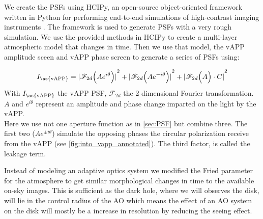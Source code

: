 \label{sec:hcipy}
We create the \acp{PSF} using \ac{HCIPy}, an open-source object-oriented framework written in Python for performing end-to-end simulations of high-contrast imaging instruments \cite{hcipy}. The framework is used to generate \acp{PSF} with a very rough simulation. We use the provided methods in \ac{HCIPy} to create a multi-layer atmospheric model that changes in time. Then we use that model, the \ac{vAPP} amplitude sceen and \ac{vAPP} phase screen to generate a series of \acp{PSF} using:

\begin{equation}
I_\text{\ac{vAPP}} = {\mathopen| \mathscr{F}_{2d}\Big( Ae^{i\theta}\Big) \mathclose|}^2 + {\mathopen| \mathscr{F}_{2d}\Big( Ae^{-i\theta}\Big) \mathclose|}^2 + {\mathopen| \mathscr{F}_{2d}\Big( A \Big) \cdot C \mathclose|}^2
\end{equation}
With $I_\text{\ac{vAPP}}$ the \ac{vAPP} \ac{PSF}, $\mathscr{F}_{2d}$ the 2 dimensional Fourier transformation. $A$ and $e^{i\theta}$ represent an amplitude and phase change imparted on the light by the \ac{vAPP}.\\

Here we use not one aperture function as in \autoref{sec:PSF} but combine three. The first two ($Ae^{\pm i\theta}$) simulate the opposing phases the circular polarization receive from the \ac{vAPP} (see \autoref{fig:into_vapp_annotated}). The third factor, is called the leakage term.

Instead of modeling an adaptive optics system we modified the Fried parameter for the atmosphere to get similar morphological changes in time to the available on-sky images. This is sufficient as the dark hole, where we will observes the disk, will lie in the control radius of the \ac{AO} which means the effect of an \ac{AO} system on the disk will mostly be a increase in resolution by reducing the seeing effect.

